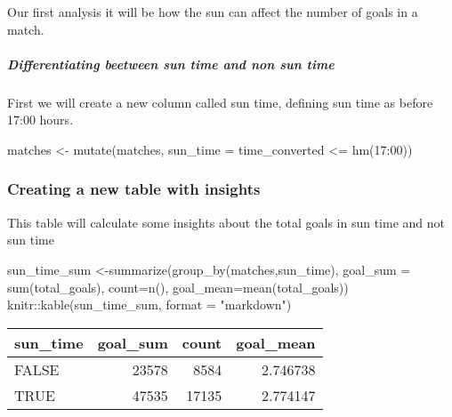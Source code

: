 \documentclass[
]{article}
\newenvironment{Shaded}{\begin{snugshade}}{\end{snugshade}}
\newcommand{\AttributeTok}[1]{\textcolor[rgb]{0.77,0.63,0.00}{#1}}
\newcommand{\FunctionTok}[1]{\textcolor[rgb]{0.00,0.00,0.00}{#1}}
\newcommand{\NormalTok}[1]{#1}
\newcommand{\OtherTok}[1]{\textcolor[rgb]{0.56,0.35,0.01}{#1}}
\newcommand{\SpecialCharTok}[1]{\textcolor[rgb]{0.00,0.00,0.00}{#1}}
\newcommand{\StringTok}[1]{\textcolor[rgb]{0.31,0.60,0.02}{#1}}
\begin{document}
Our first analysis it will be how the sun can affect the number of goals
in a match.

\hypertarget{differentiating-beetween-sun-time-and-non-sun-time}{%
\subparagraph{Differentiating beetween sun time and non sun
time}\label{differentiating-beetween-sun-time-and-non-sun-time}}

First we will create a new column called sun time, defining sun time as
before 17:00 hours.

\begin{Shaded}
\begin{Highlighting}[]
\NormalTok{matches }\OtherTok{\textless{}{-}} \FunctionTok{mutate}\NormalTok{(matches, }\AttributeTok{sun\_time =}\NormalTok{ time\_converted }\SpecialCharTok{\textless{}=} \FunctionTok{hm}\NormalTok{(}\StringTok{\textquotesingle{}17:00\textquotesingle{}}\NormalTok{))}
\end{Highlighting}
\end{Shaded}

\hypertarget{creating-a-new-table-with-insights}{%
\subsubsection{Creating a new table with
insights}\label{creating-a-new-table-with-insights}}

This table will calculate some insights about the total goals in sun
time and not sun time

\begin{Shaded}
\begin{Highlighting}[]
\NormalTok{sun\_time\_sum }\OtherTok{\textless{}{-}}\FunctionTok{summarize}\NormalTok{(}\FunctionTok{group\_by}\NormalTok{(matches,sun\_time), }\AttributeTok{goal\_sum =} \FunctionTok{sum}\NormalTok{(total\_goals), }\AttributeTok{count=}\FunctionTok{n}\NormalTok{(),}
                         \AttributeTok{goal\_mean=}\FunctionTok{mean}\NormalTok{(total\_goals))}
\NormalTok{knitr}\SpecialCharTok{::}\FunctionTok{kable}\NormalTok{(sun\_time\_sum, }\AttributeTok{format =} \StringTok{"markdown"}\NormalTok{)}
\end{Highlighting}
\end{Shaded}

\begin{longtable}[]{@{}lrrr@{}}
\toprule()
sun\_time & goal\_sum & count & goal\_mean \\
\midrule()
\endhead
FALSE & 23578 & 8584 & 2.746738 \\
TRUE & 47535 & 17135 & 2.774147 \\
\bottomrule()
\end{longtable}
\end{document}
